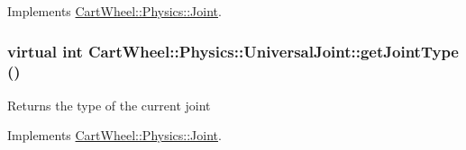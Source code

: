 Implements \hyperlink{classCartWheel_1_1Physics_1_1Joint_ab14f1e87562d9f5993504621d2cf3569}{CartWheel::Physics::Joint}.

\hypertarget{classCartWheel_1_1Physics_1_1UniversalJoint_afd2448f6efafb3e09049209e56c55996}{
\subsubsection[{getJointType}]{\setlength{\rightskip}{0pt plus 5cm}virtual int CartWheel::Physics::UniversalJoint::getJointType ()}}
\label{classCartWheel_1_1Physics_1_1UniversalJoint_afd2448f6efafb3e09049209e56c55996}
Returns the type of the current joint 

Implements \hyperlink{classCartWheel_1_1Physics_1_1Joint_a6940878e260534a3803b14aa697b88f7}{CartWheel::Physics::Joint}.

